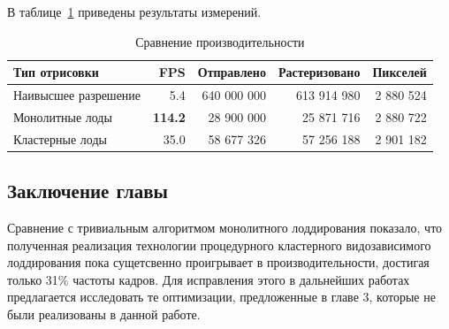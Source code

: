 В таблице~\ref{tab:cmp} приведены результаты измерений.

\begin{table}[h]
    \centering
    \caption{Сравнение производительности}

    \begin{tabular}{lrrrr}
        \hline \hline
        Тип отрисовки
        & FPS
        & Отправлено
        & Растеризовано
        & Пикселей \\ \hline
        Наивысшее разрешение
        & 5.4
        & 640 000 000
        & 613 914 980
        & 2 880 524 \\
        Монолитные лоды
        & \textbf{114.2}
        & 28 900 000
        & 25 871 716
        & 2 880 722 \\
        Кластерные лоды
        & 35.0
        & 58 677 326
        & 57 256 188
        & 2 901 182 \\
        \hline \hline
    \end{tabular}

    \label{tab:cmp}
\end{table}




\subsection*{Заключение главы}
Сравнение с тривиальным алгоритмом монолитного лоддирования показало, что полученная реализация технологии процедурного кластерного видозависимого лоддирования пока сущетсвенно проигрывает в производительности, достигая только 31\% частоты кадров.
Для исправления этого в дальнейших работах предлагается исследовать те оптимизации, предложенные в главе 3, которые не были реализованы в данной работе.
